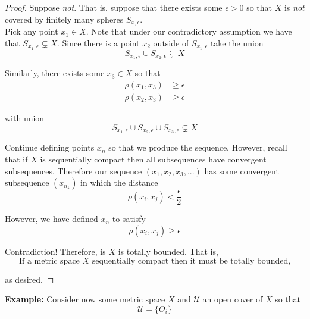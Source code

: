 \documentclass[12pt]{article}
\newlength\tindent
\renewcommand{\indent}{\hspace*{\tindent}}
\begin{document}
\begin{proof} Suppose {\em not}. That is, suppose that there exists some $\epsilon > 0$ so that $X$ is {\em not} covered by finitely many spheres $S_{x,\epsilon}$. \\

\indent Pick any point $x_1 \in X$. Note that under our contradictory assumption we have that $S_{x_1, \epsilon} \subsetneq X$. Since there is a point $x_2$ outside of $S_{x_1, \epsilon}$ take the union
\begin{equation*}
	S_{x_1, \epsilon} \cup S_{x_2,\epsilon} \subsetneq X
\end{equation*}

Similarly, there exists some $x_3 \in X$ so that
\begin{align*}
	\rho(x_1, x_3) &\geq \epsilon \\
	\rho(x_2, x_3) &\geq \epsilon
\end{align*}

with union
\begin{equation*}
	S_{x_1, \epsilon} \cup S_{x_2,\epsilon} \cup S_{x_3, \epsilon} \subsetneq X
\end{equation*}

\indent Continue defining points $x_n$ so that we produce the sequence. However, recall that if $X$ is sequentially compact then all subsequences have convergent subsequences. Therefore our sequence $(x_1, x_2, x_3, ...)$ has some convergent subsequence $(x_{n_k})$ in which the distance
\begin{equation*}
	\rho(x_i, x_j) < \frac{\epsilon}{2}
\end{equation*}

However, we have defined $x_n$ to satisfy
\begin{equation*}
	\rho(x_i, x_j) \geq \epsilon
\end{equation*}

Contradiction! Therefore, is $X$ is totally bounded. That is, 
\begin{equation*}
	\text{If a metric space $X$ sequentially compact then it must be totally bounded,}
\end{equation*}

as desired.
\end{proof}

%
%
{\bf Example:} Consider now some metric space $X$ and $\mathcal U$ an open cover of $X$ so that
\begin{equation*}
	\mathcal U = \{O_i\}
\end{equation*}
\end{document}
